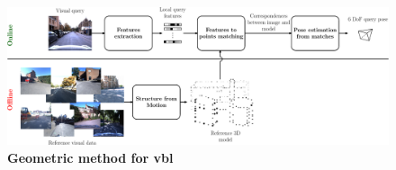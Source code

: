 \begin{figure}[t]
	\centering

	\includegraphics[width=\linewidth]{methods/geometric_method}
	\caption[Geometric method]{\textbf{Geometric method for \acs{vbl}} \label{fig:geometric_method}}
\end{figure}
